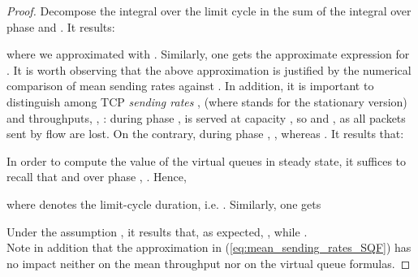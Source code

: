 \documentclass[a4paper,oneside, 11pt]{article}
\begin{document}
\begin{appendix}
\begin{proof}
Decompose the integral over the limit cycle  in the sum of the integral over phase  and .
It results:

where we approximated  with .
Similarly, one gets the approximate expression for .
It is worth observing that the above approximation is justified by the numerical comparison of mean sending rates against .
In addition, it is important to distinguish among TCP \textit{sending rates} ,  (where  stands for the stationary version) and throughputs, , :
during phase ,  is served at capacity , so  and , as all packets sent by flow  are lost.
On the contrary, during phase , , whereas .
It results that:

In order to compute the value of the virtual queues in steady state, it suffices to recall that  and over phase , .
Hence,

where  denotes the limit-cycle duration, i.e. .
Similarly, one gets

Under the assumption , it results that, as expected, , while .\\
Note in addition that the approximation  in (\ref{eq:mean_sending_rates_SQF}) has no impact neither on the mean throughput nor on the virtual queue formulas.

\end{proof}

\end{appendix}
\end{document}
